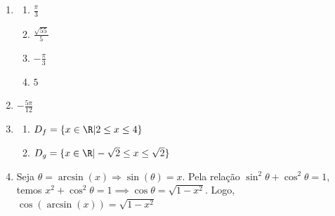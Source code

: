 \begin{enumerate}
\item
\begin{enumerate}
    \item $\frac{\pi}{3}$
    \item $\frac{\sqrt{55}}{5}$
    \item $-\frac{\pi}{3}$
    \item $5$
\end{enumerate}
\item $-\frac{5\pi}{12}$
\item
    \begin{enumerate}
        \item $D_f= \{ x \in \R | 2 \leq x \leq 4\}$
        \item $D_g= \{ x \in \R| -\sqrt{2} \leq x \leq \sqrt{2}\}$
    \end{enumerate}

\item Seja $\theta = \arcsin(x) \Rightarrow \sin(\theta) = x$. Pela relação $\sin^2\theta + \cos^2\theta = 1$, temos $x^2 + \cos^2\theta = 1 \implies \cos\theta = \sqrt{1-x^2}$. Logo, $\cos(\arcsin(x)) = \sqrt{1-x^2}$
\end{enumerate}

